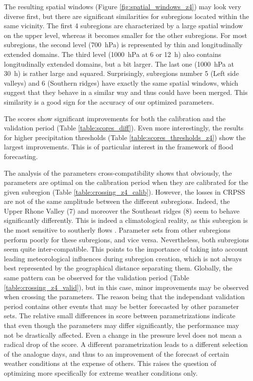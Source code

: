 \documentclass[twocol]{ametsoc}
\begin{document}
The resulting spatial windows (Figure \ref{fig:spatial_windows_z4}) may look very diverse first, but there are significant similarities for subregions located within the same vicinity. The first 4 subregions are characterized by a large spatial window on the upper level, whereas it becomes smaller for the other subregions. For most subregions, the second level (700~hPa) is represented by thin and longitudinally extended domains. The third level (1000~hPa at 6 or 12~h) also contains longitudinally extended domains, but a bit larger. The last one (1000~hPa at 30~h) is rather large and squared. Surprisingly, subregions number 5 (Left side valleys) and 6 (Southern ridges) have exactly the same spatial windows, which suggest that they behave in a similar way and thus could have been merged. This similarity is a good sign for the accuracy of our optimized parameters.

The scores show significant improvements for both the calibration and the validation period (Table \ref{table:scores_diff}). Even more interestingly, the results for higher precipitation thresholds (Table \ref{table:scores_thresholds_z4}) show the largest improvements. This is of particular interest in the framework of flood forecasting.

The analysis of the parameters cross-compatibility shows that obviously, the parameters are optimal on the calibration period when they are calibrated for the given subregion (Table \ref{table:crossing_z4_calib}). However, the losses in CRPSS are not of the same amplitude between the different subregions. Indeed, the Upper Rhone Valley (7) and moreover the Southeast ridges (8) seem to behave significantly differently. This is indeed a climatological reality, as this subregion is the most sensitive to southerly flows \citep{Horton2012}. Parameter sets from other subregions perform poorly for these subregions, and vice versa. Nevertheless, both subregions seem quite inter-compatible. This points to the importance of taking into account leading meteorological influences during subregion creation, which is not always best represented by the geographical distance separating them. Globally, the same pattern can be observed for the validation period (Table \ref{table:crossing_z4_valid}), but in this case, minor improvements may be observed when crossing the parameters. The reason being that the independant validation period contains other events that may be better forecasted by other parameter sets. The relative small differences in score between parametrizations indicate that even though the parameters may differ significantly, the performance may not be drastically affected. Even a change in the pressure level does not mean a radical drop of the score. A different parametrization leads to a different selection of the analogue days, and thus to an improvement of the forecast of certain weather conditions at the expense of others. This raises the question of optimizing more specifically for extreme weather conditions only. 
 
\end{document}
